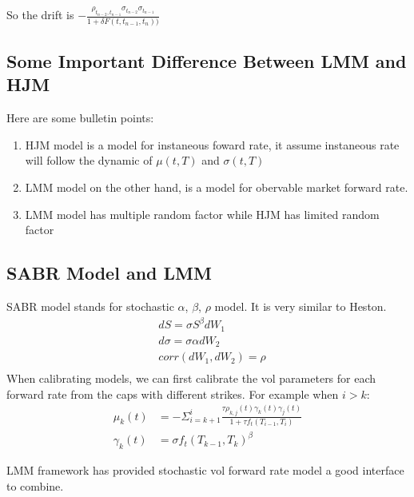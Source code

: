 So the drift is $ -\frac{\rho_{t_{n-2}, t_{n-1}}\sigma_{t_{n-2}}\sigma_{t_{n-1}}}{1 + \delta F(t, t_{n-1}, t_{n}))} $

\subsection{Some Important Difference Between LMM and HJM}
Here are some bulletin points:
\begin{enumerate}
  \item HJM model is a model for instaneous foward rate, it assume instaneous rate will follow the dynamic of $\mu(t, T)$ and $\sigma(t, T)$
  \item LMM model on the other hand, is a model for obervable market forward rate.
  \item LMM model has multiple random factor while HJM has limited random factor
\end{enumerate}

\subsection{SABR Model and LMM}
SABR model stands for stochastic $\alpha$, $\beta$, $\rho$ model. It is very similar to Heston.
\begin{equation}
\begin{aligned}
& dS = \sigma S^{\beta} dW_1\\
& d\sigma = \sigma \alpha dW_2\\
& corr(dW_1, dW_2) = \rho\\
\end{aligned}
\end{equation}
When calibrating models, we can first calibrate the vol parameters for each forward rate from the caps with different strikes.
For example when $i > k$:
\begin{equation}
\begin{aligned}
\mu_k(t) &= - \Sigma_{i=k+1}^i\frac{\tau \rho_{k, j}(t) \gamma_k(t) \gamma_j(t)}{1 + \tau f_t(T_{i-1}, T_i)}\\
\gamma_k(t) &= \sigma f_t(T_{k-1}, T_k)^{\beta}
\end{aligned}
\end{equation}

LMM framework has provided stochastic vol forward rate model a good interface to combine.

